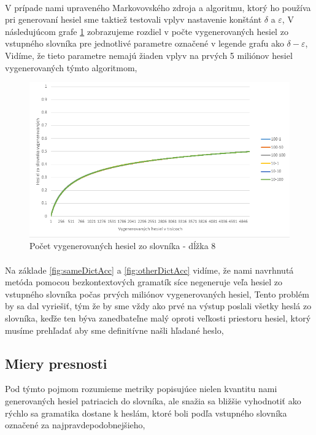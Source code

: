 \paragraph{}
V prípade nami upraveného Markovovského zdroja a algoritmu, ktorý ho používa pri generovaní hesiel sme taktiež testovali vplyv nastavenie konštánt \(\delta\) a \(\varepsilon\), V následujúcom grafe \ref{fig:MarkovV2} zobrazujeme rozdiel v počte vygenerovaných hesiel zo vstupného slovníka pre jednotlivé parametre označené v legende grafu ako \(\delta-\varepsilon\), Vidíme, že tieto parametre nemajú žiaden vplyv na prvých 5 miliónov hesiel vygenerovaných týmto algoritmom,

\begin{figure}[ht]
    \centering
    \includegraphics[width=1\textwidth]{sameDictAccMarkv2}
    \caption{Počet vygenerovaných hesiel zo slovníka - dĺžka 8}
    \label{fig:MarkovV2}
\end{figure}

\paragraph{}
Na základe \ref{fig:sameDictAcc} a \ref{fig:otherDictAcc} vidíme, že nami navrhnutá metóda pomocou bezkontextových gramatík síce negeneruje veľa hesiel zo vstupného slovníka počas prvých miliónov vygenerovaných hesiel, Tento problém by sa dal vyriešiť, tým že by sme vždy ako prvé na výstup poslali všetky heslá zo slovníka, keďže ten býva zanedbateľne malý oproti veľkosti priestoru hesiel, ktorý musíme prehľadať aby sme definitívne našli hľadané heslo,

\subsection{Miery presnosti}
Pod týmto pojmom rozumieme metriky popisujúce nielen kvantitu nami generovaných hesiel patriacich do slovníka, ale snažia sa bližšie vyhodnotiť ako rýchlo sa gramatika dostane k heslám, ktoré boli podľa vstupného slovníka označené za najpravdepodobnejšieho,

